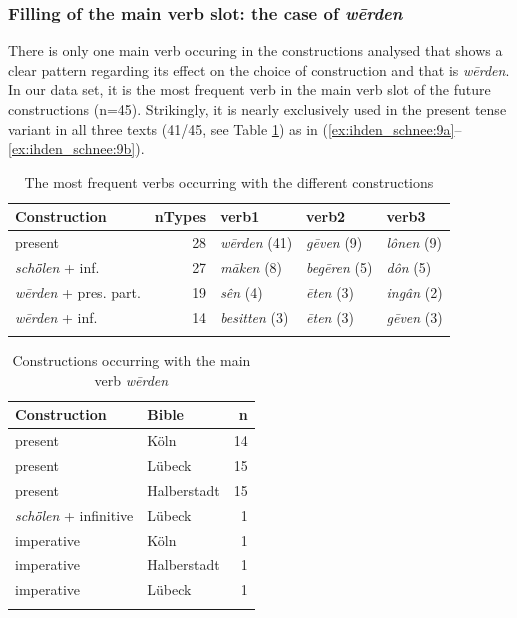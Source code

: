 \documentclass[output=paper,colorlinks,citecolor=brown]{langscibook}
\begin{document}
\subsubsection{Filling of the main verb slot: the case of \textit{wērden}}\label{chap:verbslot} 
There is only one main verb occuring in the constructions analysed that shows a clear pattern regarding its effect on the choice of construction and that is \textit{wērden}. In our data set, it is the most frequent verb in the main verb slot of the future constructions (n=45). Strikingly, it is nearly exclusively used in the present tense variant in all three texts (41/45, see Table \ref{tab:ihden_schnee:mainverbs_cxs}) as in (\ref{ex:ihden_schnee:9a}--\ref{ex:ihden_schnee:9b}). 

\begin{table}
\caption{The most frequent verbs occurring with the different constructions}
\label{tab:ihden_schnee:mainverbs_cxs}
 \begin{tabularx}{0.9\textwidth}{lrlll}
  \lsptoprule
  Construction & nTypes & verb1 & verb2 & verb3 \\
  \midrule
  present &28 &  \textit{wērden} (41)& \textit{gēven} (9) & \textit{lônen} (9) \\
  \textit{schȫlen} + inf. &27 & \textit{māken}  (8)& \textit{begēren} (5)& \textit{dôn} (5) \\
  \textit{wērden} + pres. part. &19 & \textit{sên} (4) & \textit{ēten}  (3)&  \textit{ingân} (2) \\
  \textit{wērden} + inf. &14 & \textit{besitten} (3) & \textit{ēten}  (3) & \textit{gēven} (3)\\
  \lspbottomrule
 \end{tabularx}
\end{table}

\begin{table}
\caption{Constructions occurring with the main verb \textit{wērden}}
\label{tab:ihden_schnee:mainverbwerden}
 \begin{tabularx}{.6\textwidth}{X lr}
  \lsptoprule
  Construction & Bible & n \\
  \midrule
 present & Köln & 14 \\
 present & Lübeck & 15 \\
 present & Halberstadt & 15 \\
 \textit{schȫlen} + infinitive & Lübeck & 1\\
 imperative & Köln &1\\
 imperative & Halberstadt & 1\\
 imperative & Lübeck & 1 \\
 \lspbottomrule
 \end{tabularx}
\end{table}
\end{document}
